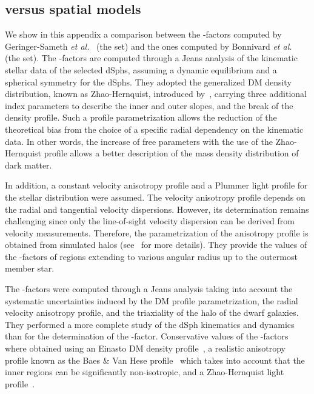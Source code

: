 \subsection{\GS versus \B spatial models}\label{sec:gd_gsVb}

We show in this appendix a comparison between the \J-factors computed by Geringer-Sameth \emph{et al.}~\cite{Geringer-Sameth:2014yza} (the \GS set) and the ones computed by Bonnivard \emph{et al.}~\cite{Bonnivard:2014kza, Bonnivard:2015xpq} (the \B set).
%
The \GS \J-factors are computed through a Jeans analysis of the kinematic stellar data of the  selected dSphs, assuming a dynamic equilibrium and a spherical symmetry for the dSphs.
They adopted the generalized DM density distribution, known as Zhao-Hernquist, introduced by~\cite{Zhao:1995cp}, carrying three additional index parameters to describe the inner and outer slopes, and the break of the density profile.
Such a profile parametrization allows the reduction of the theoretical bias from the choice of a specific radial dependency on the kinematic data.
In other words, the increase of free parameters with the use of the  Zhao-Hernquist profile allows a better description of the mass density distribution of dark matter.

In addition, a constant velocity anisotropy profile and a Plummer light profile \cite{10.1093/mnras/71.5.460} for the stellar distribution were assumed.
The velocity anisotropy profile depends on the radial and tangential velocity dispersions.
However, its determination remains challenging since only the line-of-sight velocity dispersion can be derived from velocity measurements.
Therefore, the parametrization of the anisotropy profile is obtained from simulated halos (see~\cite{Hunter:2013vua} for more details).
They provide the values of the \J-factors of regions extending to various angular radius up to the outermost member star.


The \B \J-factors were computed through a Jeans analysis taking into account the systematic uncertainties induced by the DM profile parametrization, the radial velocity anisotropy profile, and the triaxiality of the halo of the dwarf galaxies.
They performed a more complete study of the dSph kinematics and dynamics than \GS for the determination of the \J-factor.
Conservative values of the \J-factors where obtained using an Einasto DM density profile~\cite{Dhar_2010}, a realistic anisotropy profile known as the Baes \& Van Hese profile~\cite{Baes:2007tx} which takes into account that the inner regions can be significantly non-isotropic, and a Zhao-Hernquist light profile~\cite{Zhao:1995cp}.

